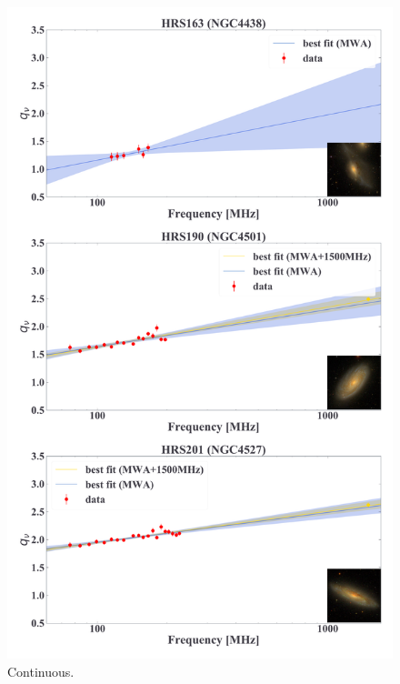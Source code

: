 \documentclass[12pt,a4paper,twoside,openright,final,titlepage]{report}
\begin{document}
\begin{appendices}
\begin{figure}[htbp]
    \centering
    \includegraphics[width=.8\linewidth]{Figures/AppendixC_qfitting4.pdf}
    \caption[Fitting results for 18 samples (4)]{\label{fig:fittingresults4}
        Continuous.
    }
\end{figure}


\end{appendices}
\end{document}
